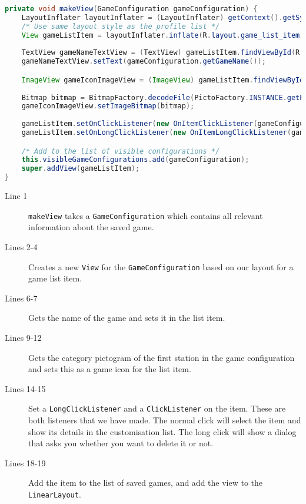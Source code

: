 \begin{lstlisting}[language=java,firstnumber=1,caption={The method to create a list item.},label=lst:makeview]
private void makeView(GameConfiguration gameConfiguration) {
    LayoutInflater layoutInflater = (LayoutInflater) getContext().getSystemService(Context.LAYOUT_INFLATER_SERVICE);
    /* Use same layout style as the profile list */
    View gameListItem = layoutInflater.inflate(R.layout.game_list_item);
    
    TextView gameNameTextView = (TextView) gameListItem.findViewById(R.id.gameName);
    gameNameTextView.setText(gameConfiguration.getGameName());

    ImageView gameIconImageView = (ImageView) gameListItem.findViewById(R.id.gameIcon);
    
    Bitmap bitmap = BitmapFactory.decodeFile(PictoFactory.INSTANCE.getPictogram(super.getContext(),gameConfiguration.getStation(0).getCategory()).getImagePath());
    gameIconImageView.setImageBitmap(bitmap);
    
    gameListItem.setOnClickListener(new OnItemClickListener(gameConfiguration));
    gameListItem.setOnLongClickListener(new OnItemLongClickListener(gameConfiguration));

    /* Add to the list of visible configurations */
    this.visibleGameConfigurations.add(gameConfiguration);
    super.addView(gameListItem);
}
\end{lstlisting}
\begin{description}
\item[Line 1] \lstinline|makeView| takes a \lstinline|GameConfiguration| which contains all relevant information about the saved game.
\item[Lines 2-4] Creates a new \lstinline|View| for the \lstinline|GameConfiguration| based on our layout for a game list item.
\item[Lines 6-7] Gets the name of the game and sets it in the list item.
\item[Lines 9-12] Gets the category pictogram of the first station in the game configuration and sets this as a game icon for the list item.
\item[Lines 14-15] Set a \lstinline|LongClickListener| and a \lstinline|ClickListener| on the item. These are both listeners that we have made. The normal click will select the item and show its details in the customisation list. The long click will show a dialog that asks you whether you want to delete it or not.
\item[Lines 18-19] Add the item to the list of saved games, and add the view to the \lstinline|LinearLayout|.
\end{description}
